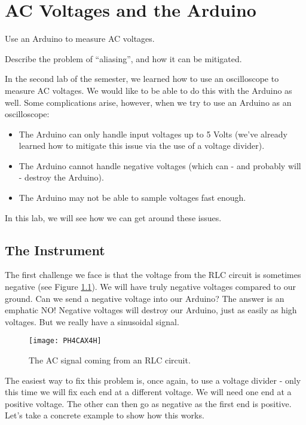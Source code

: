 \chapter{AC Voltages and the Arduino}

\objectives
{
\item Use an Arduino to measure AC voltages.
\item Describe the problem of ``aliasing'', and how it can be mitigated.
}

In the second lab of the semester, we learned how to use an oscilloscope to
measure AC voltages. We would like to be able to do this with the Arduino as
well. 
Some complications arise, however, when we try to use an Arduino as an 
oscilloscope:
\begin{itemize}
	\item The Arduino can only handle input voltages up to 5 Volts
		(we've already learned how to mitigate this issue via the
		use of a voltage divider).
	\item The Arduino cannot handle negative voltages (which can - and
		probably will - destroy the Arduino).
	\item The Arduino may not be able to sample voltages fast enough.
\end{itemize}
In this lab, we will see how we can get around these issues.

\section{The Instrument}

The first challenge we face is that the voltage from the RLC circuit is
sometimes negative (see Figure \ref{fig:rlc_signal}).
We will have truly negative voltages compared to our ground. Can
we send a negative voltage into our Arduino? The answer is an emphatic NO!
Negative voltages will destroy our Arduino, just as easily as high
voltages. But we really have a
sinusoidal signal. 
\begin{figure}[htbp!]
\centering
\texttt{[image: PH4CAX4H]}
	\caption{The AC signal coming from an RLC circuit.}
	\label{fig:rlc_signal}
\end{figure}

The easiest way to fix this problem is, once again, to use a voltage
divider - only this time we will fix each end at a different voltage. We will
need one end at a positive voltage. The other can then go as negative as the
first end is positive. Let's take a concrete example to show how this works.

